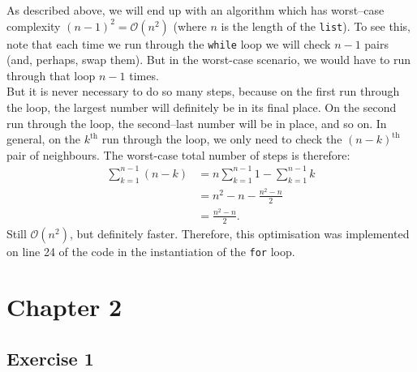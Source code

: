 \documentclass{report}
\begin{document}
As described above, we will end up with an algorithm which has worst--case complexity $\left(n-1\right)^2=\mathcal{O}\left(n^2\right)$ (where $n$ is the length of the \verb|list|). To see this, note that each time we run through the \verb|while| loop we will check $n-1$ pairs (and, perhaps, swap them). But in the worst-case scenario, we would have to run through that loop $n-1$ times.\\
\indent But it is never necessary to do so many steps, because on the first run through the loop, the largest number will definitely be in its final place. On the second run through the loop, the second--last number will be in place, and so on. In general, on the $k^{\text{th}}$ run through the loop, we only need to check the $(n-k)^{\text{th}}$ pair of neighbours. The worst-case total number of steps is therefore:
\begin{align}
\sum_{k=1}^{n-1}\left(n-k\right)&=n\sum_{k=1}^{n-1}1-\sum_{k=1}^{n-1}k\nonumber\\
&=n^2-n-\frac{n^2-n}{2}\\
&=\frac{n^2-n}{2}.\nonumber
\end{align}
Still $\mathcal{O}\left(n^2\right)$, but definitely faster. Therefore, this optimisation was implemented on line 24 of the code in the instantiation of the \verb|for| loop.
\chapter*{Chapter 2} %
\section*{Exercise 1}
\end{document}
